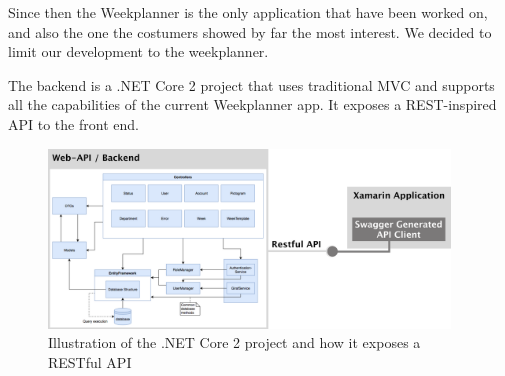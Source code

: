 Since then the Weekplanner is the only application that have been worked on, and also the one the costumers showed by far the most interest. We decided to limit our development to the weekplanner. 


The backend is a .NET Core 2 project that uses traditional MVC and supports all the capabilities of the current Weekplanner app. It exposes a REST-inspired API to the front end.
\begin{figure}[H]
        \begin{center}
            \includegraphics[width=0.95\textwidth]{figures/RestAPIFigure.pdf}
        \end{center}
        \caption{Illustration of the .NET Core 2 project and how it exposes a RESTful API}
        \label{fig:RestAPIFigure}
\end{figure}

